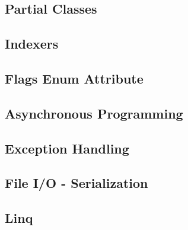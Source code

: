 \subsection{Partial Classes}
\label{partialClass}


\subsection{Indexers}
\label{indexers}


\subsection{Flags Enum Attribute}
\label{flags}


\subsection{Asynchronous Programming}
\label{asynchronousProgramming}


\subsection{Exception Handling}
\label{exceptionHandling}


\subsection{File I/O - Serialization}
\label{fileIO}


\subsection{Linq}
\label{linq}
